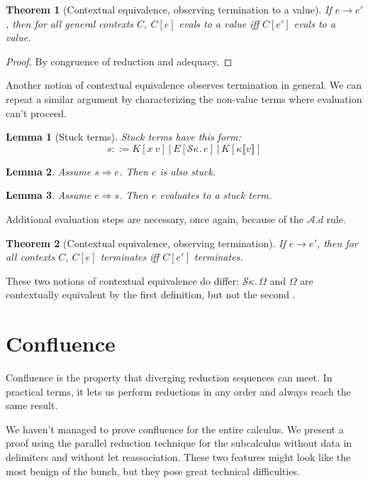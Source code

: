 \documentclass[a4paper, 11pt,titlepage, openright, twoside]{report}
\newcommand{\Int}{\Rightarrow}
\newcommand{\keyword}[1]{\textsf{\textup{#1}}}
\newcommand{\KwLet}{\keyword{let}}
\renewcommand{\S}{\mathcal{S}}
\newcommand{\A}{\mathcal{A}}
\newcommand{\+}{\enspace}
\newtheorem{lemma}{Lemma}
\newtheorem{theorem}{Theorem}
\begin{document}
\begin{theorem}[Contextual equivalence, observing termination to a value]
	\label{ctxeqv1}
	If $e → e'$, then for all general contexts $C$, $C[e]$ evals to a value iff $C[e']$ evals to a value.%
\end{theorem}
\begin{proof}
	By congruence of reduction and adequacy.
\end{proof}

Another notion of contextual equivalence observes termination in general.
We can repeat a similar argument by characterizing the non-value terms
where evaluation can't proceed.

\begin{lemma}[Stuck terms]
	Stuck terms have this form:
	$$s ::= K[x\:v] │ E[\S κ.\,e] │ K[κ⟦v⟧]$$
\end{lemma}

\begin{lemma} Assume $s \Int e$. Then $e$ is also stuck.
\end{lemma}

\begin{lemma} Assume $e \Int s$. Then $e$ evaluates to a stuck term.
\end{lemma}
Additional evaluation steps are necessary, once again, because of the $\A.d$ rule.

\begin{theorem}[Contextual equivalence, observing termination]
	If $e → e'$, then for all contexts $C$, $C[e]$ terminates iff $C[e']$ terminates.
\end{theorem}

These two notions of contextual equivalence do differ:
$\S κ.\,Ω$ and $Ω$ are contextually equivalent by the first definition,
but not the second \cite{bisim}.



\chapter{Confluence}
Confluence is the property
that diverging reduction sequences can meet.
In practical terms, it lets us perform reductions in any order
and always reach the same result.

We haven't managed to prove confluence for
the entire calculus.
We present a proof using the parallel reduction technique for the subcalculus without
data in delimiters and without \KwLet{} reassociation.
These two features might look like the most benign of the bunch,
but they pose great technical difficulties.
\end{document}
